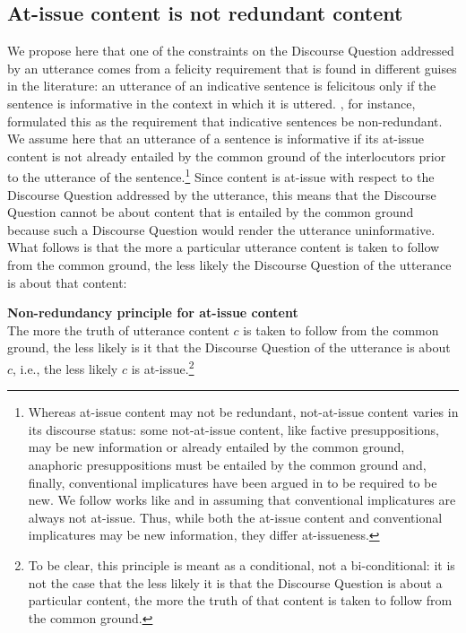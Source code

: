 \documentclass[11pt,fleqn]{article}
\newcommand{\6}{\mbox{$[\hspace*{-.6mm}[$}}
\newcommand{\9}{\mbox{$]\hspace*{-.6mm}]$}}
\begin{document}
\subsection{At-issue content is not redundant content}\label{s23}

We propose here that one of the constraints on the Discourse Question addressed by an utterance comes from a felicity requirement that is found in different guises in the literature: an utterance of an indicative sentence is felicitous only if the sentence is informative in the context in which it is uttered. \citet[144]{groenendijk1999}, for instance, formulated this as the requirement that indicative sentences be non-redundant. We assume here that an utterance of a sentence is informative if its at-issue content is not already entailed by the common ground of the interlocutors prior to the utterance of the sentence.\footnote{Whereas at-issue content may not be redundant, not-at-issue content varies in its discourse status: some not-at-issue content, like factive presuppositions, may be new information or already entailed by the common ground, anaphoric presuppositions must be entailed by the common ground and, finally, conventional implicatures have been argued in \citealt{potts05} to be required to be new. We follow works like \citealt{potts05} and \citealt{murray2014} in assuming that conventional implicatures are always not at-issue. Thus, while both the at-issue content and conventional implicatures may be new information, they differ at-issueness.} Since content is at-issue with respect to the Discourse Question addressed by the utterance, this means that the Discourse Question cannot be about content that is entailed by the common ground because such a Discourse Question would render the utterance uninformative. What follows is that the more a particular utterance content is taken to follow from the common ground, the less likely the Discourse Question of the utterance is about that content:

\begin{exe}

\ex\label{principle} {\bf Non-redundancy principle for at-issue content} \\ The more the truth of utterance content $c$ is taken to follow from the common ground, the less likely is it that the Discourse Question of the utterance is about $c$, i.e., the less likely $c$ is at-issue.\footnote{To be clear, this principle is meant as a conditional, not a bi-conditional: it is not the case that the less likely it is that the Discourse Question is about a particular content, the more the truth of that content is taken to follow from the common ground.}

\end{exe}
\end{document}
